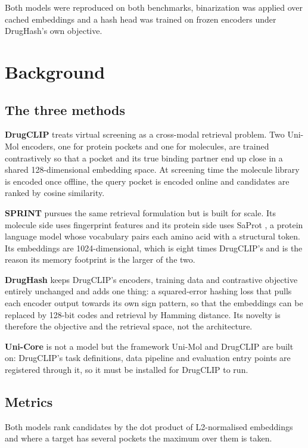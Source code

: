 \documentclass[10pt,a4paper]{article}
\begin{document}
Both models were reproduced on both benchmarks, binarization was applied over cached
embeddings and a hash head was trained on frozen encoders under DrugHash's own objective.

\section{Background}\label{sec:background}

\subsection{The three methods}
\textbf{DrugCLIP} \citep{bib:drugclip} treats virtual screening as a cross-modal retrieval problem. Two Uni-Mol
\citep{bib:unimol} encoders, one for protein pockets and one for molecules, are trained contrastively so that a
pocket and its true binding partner end up close in a shared 128-dimensional embedding space.
At screening time the molecule library is encoded once offline, the query pocket is encoded
online and candidates are ranked by cosine similarity.

\textbf{SPRINT} \citep{bib:sprint} pursues the same retrieval formulation but is built for scale. Its molecule
side uses fingerprint features and its protein side uses SaProt \citep{bib:saprot}, a protein language model
whose vocabulary pairs each amino acid with a structural token. Its embeddings are
1024-dimensional, which is eight times DrugCLIP's and is the reason its memory footprint is
the larger of the two.

\textbf{DrugHash} \citep{bib:drughash} keeps DrugCLIP's encoders, training data and contrastive objective entirely
unchanged and adds one thing: a squared-error hashing loss that pulls each encoder output
towards its own sign pattern, so that the embeddings can be replaced by 128-bit codes and
retrieval by Hamming distance. Its novelty is therefore the objective and the retrieval space,
not the architecture.

\textbf{Uni-Core} \citep{bib:unicore} is not a model but the framework Uni-Mol and DrugCLIP are built on:
DrugCLIP's task definitions, data pipeline and evaluation entry points are registered through
it, so it must be installed for DrugCLIP to run.

\subsection{Metrics}
Both models rank candidates by the dot product of L2-normalised embeddings and where a target
has several pockets the maximum over them is taken.
\end{document}
